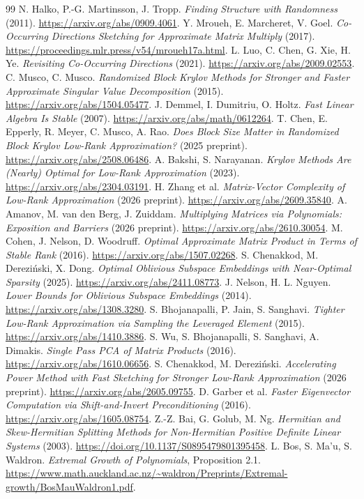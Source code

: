 \documentclass[11pt]{article}
\theoremstyle{remark}
\begin{document}
\begin{thebibliography}{99}
 N. Halko, P.-G. Martinsson, J. Tropp.
\emph{Finding Structure with Randomness} (2011).
\url{https://arxiv.org/abs/0909.4061}.
 Y. Mroueh, E. Marcheret, V. Goel.
\emph{Co-Occurring Directions Sketching for Approximate Matrix Multiply} (2017).
\url{https://proceedings.mlr.press/v54/mroueh17a.html}.
 L. Luo, C. Chen, G. Xie, H. Ye.
\emph{Revisiting Co-Occurring Directions} (2021).
\url{https://arxiv.org/abs/2009.02553}.
 C. Musco, C. Musco.
\emph{Randomized Block Krylov Methods for Stronger and Faster Approximate
Singular Value Decomposition} (2015).
\url{https://arxiv.org/abs/1504.05477}.
 J. Demmel, I. Dumitriu, O. Holtz.
\emph{Fast Linear Algebra Is Stable} (2007).
\url{https://arxiv.org/abs/math/0612264}.
 T. Chen, E. Epperly, R. Meyer, C. Musco, A. Rao.
\emph{Does Block Size Matter in Randomized Block Krylov Low-Rank Approximation?}
(2025 preprint).
\url{https://arxiv.org/abs/2508.06486}.
 A. Bakshi, S. Narayanan.
\emph{Krylov Methods Are (Nearly) Optimal for Low-Rank Approximation} (2023).
\url{https://arxiv.org/abs/2304.03191}.
 H. Zhang et al.
\emph{Matrix-Vector Complexity of Low-Rank Approximation} (2026 preprint).
\url{https://arxiv.org/abs/2609.35840}.
 A. Amanov, M. van den Berg, J. Zuiddam.
\emph{Multiplying Matrices via Polynomials: Exposition and Barriers}
(2026 preprint).
\url{https://arxiv.org/abs/2610.30054}.
 M. Cohen, J. Nelson, D. Woodruff.
\emph{Optimal Approximate Matrix Product in Terms of Stable Rank} (2016).
\url{https://arxiv.org/abs/1507.02268}.
 S. Chenakkod, M. Derezi\'nski, X. Dong.
\emph{Optimal Oblivious Subspace Embeddings with Near-Optimal Sparsity} (2025).
\url{https://arxiv.org/abs/2411.08773}.
 J. Nelson, H. L. Nguyen.
\emph{Lower Bounds for Oblivious Subspace Embeddings} (2014).
\url{https://arxiv.org/abs/1308.3280}.
 S. Bhojanapalli, P. Jain, S. Sanghavi.
\emph{Tighter Low-Rank Approximation via Sampling the Leveraged Element} (2015).
\url{https://arxiv.org/abs/1410.3886}.
 S. Wu, S. Bhojanapalli, S. Sanghavi, A. Dimakis.
\emph{Single Pass PCA of Matrix Products} (2016).
\url{https://arxiv.org/abs/1610.06656}.
 S. Chenakkod, M. Derezi\'nski.
\emph{Accelerating Power Method with Fast Sketching for Stronger Low-Rank
Approximation} (2026 preprint).
\url{https://arxiv.org/abs/2605.09755}.
 D. Garber et al.
\emph{Faster Eigenvector Computation via Shift-and-Invert Preconditioning} (2016).
\url{https://arxiv.org/abs/1605.08754}.
 Z.-Z. Bai, G. Golub, M. Ng.
\emph{Hermitian and Skew-Hermitian Splitting Methods for Non-Hermitian Positive
Definite Linear Systems} (2003).
\url{https://doi.org/10.1137/S0895479801395458}.
 L. Bos, S. Ma'u, S. Waldron.
\emph{Extremal Growth of Polynomials}, Proposition 2.1.
\url{https://www.math.auckland.ac.nz/~waldron/Preprints/Extremal-growth/BosMauWaldron1.pdf}.
\end{thebibliography}
\end{document}
